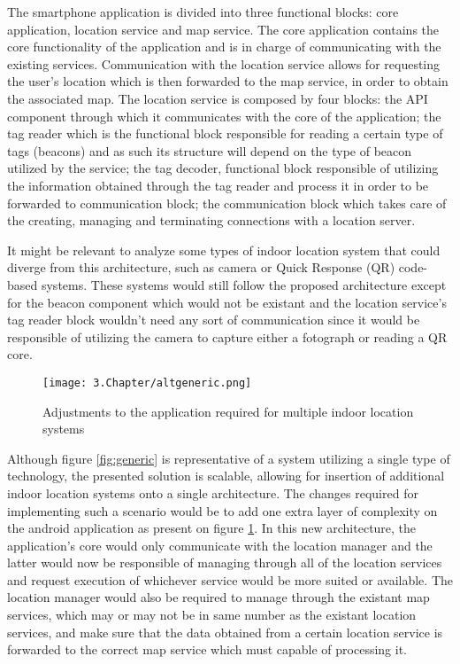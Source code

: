 The smartphone application is divided into three functional blocks: core application, location service and map service. The core application contains the core functionality of the application and is in charge of communicating with the existing services. Communication with the location service allows for requesting the user's location which is then forwarded to the map service, in order to obtain the associated map. The location service is composed by four blocks: the API component through which it communicates with the core of the application; the tag reader which is the functional block responsible for reading a certain type of tags (beacons) and as such its structure will depend on the type of beacon utilized by the service; the tag decoder, functional block responsible of utilizing the information obtained through the tag reader and process it in order to be forwarded to communication block; the communication block which takes care of the creating, managing and terminating connections with a location server.

It might be relevant to analyze some types of indoor location system that could diverge from this architecture, such as camera or Quick Response (QR) code-based systems. These systems would still follow the proposed architecture except for the beacon component which would not be existant and the location service's tag reader block wouldn't need any sort of communication since it would be responsible of utilizing the camera to capture either a fotograph or reading a QR core.


\begin{figure}
	\centering
		\texttt{[image: 3.Chapter/altgeneric.png]}
	\caption[Adjustments to the application required for multiple indoor location systems]{Adjustments to the application required for multiple indoor location systems}
	\label{fig:altgeneric}
\end{figure}

Although figure \ref{fig:generic} is representative of a system utilizing a single type of technology, the presented solution is scalable, allowing for insertion of additional indoor location systems onto a single architecture. The changes required for implementing such a scenario would be to add one extra layer of complexity on the android application as present on figure \ref{fig:altgeneric}. In this new architecture, the application's core would only communicate with the location manager and the latter would now be responsible of managing through all of the location services and request execution of whichever service would be more suited or available. The location manager would also be required to manage through the existant map services, which may or may not be in same number as the existant location services, and make sure that the data obtained from a certain location service is forwarded to the correct map service which must capable of processing it.





